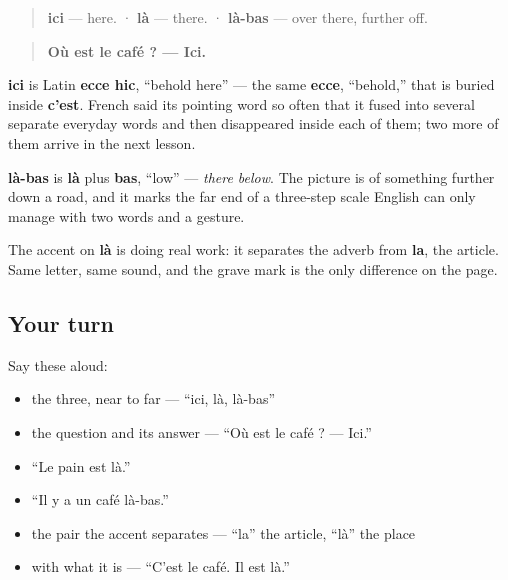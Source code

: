 \begin{cousinweb}
\begin{quote}
\textbf{ici} — here. · \textbf{là} — there. · \textbf{là-bas} — over there, further off.
\end{quote}

\begin{quote}
\textbf{Où est le café ? — Ici.}
\end{quote}

\textbf{ici} is Latin \textbf{ecce hic}, \textquotedblleft{}behold here\textquotedblright{} — the same \textbf{ecce}, \textquotedblleft{}behold,\textquotedblright{} that is buried inside \textbf{c'est}. French said its pointing word so often that it fused into several separate everyday words and then disappeared inside each of them; two more of them arrive in the next lesson.

\textbf{là-bas} is \textbf{là} plus \textbf{bas}, \textquotedblleft{}low\textquotedblright{} — \emph{there below}. The picture is of something further down a road, and it marks the far end of a three-step scale English can only manage with two words and a gesture.

The accent on \textbf{là} is doing real work: it separates the adverb from \textbf{la}, the article. Same letter, same sound, and the grave mark is the only difference on the page.
\end{cousinweb}

\subsection*{Your turn}
Say these aloud:

\begin{itemize}
\raggedright
  \item the three, near to far — \textquotedblleft{}ici, là, là-bas\textquotedblright{}
  \item the question and its answer — \textquotedblleft{}Où est le café ? — Ici.\textquotedblright{}
  \item \textquotedblleft{}Le pain est là.\textquotedblright{}
  \item \textquotedblleft{}Il y a un café là-bas.\textquotedblright{}
  \item the pair the accent separates — \textquotedblleft{}la\textquotedblright{} the article, \textquotedblleft{}là\textquotedblright{} the place
  \item with what it is — \textquotedblleft{}C'est le café. Il est là.\textquotedblright{}
\end{itemize}

